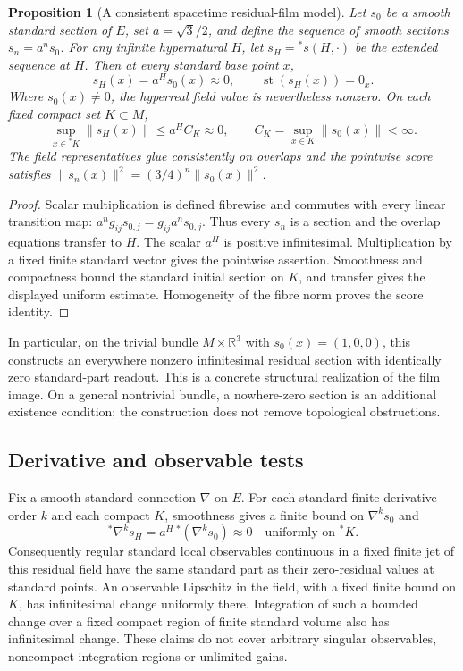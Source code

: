 \documentclass[11pt,a4paper]{article}
\newtheorem{proposition}{Proposition}
\begin{document}
\begin{proposition}[A consistent spacetime residual-film model]
Let $s_0$ be a smooth standard section of $E$, set $a=\sqrt3/2$, and define
the sequence of smooth sections $s_n=a^n s_0$. For any infinite hypernatural
$H$, let $s_H={}^*s(H,\cdot)$ be the extended sequence at $H$. Then at every
standard base point $x$,
\[
s_H(x)=a^H s_0(x)\approx0,\qquad
\operatorname{st}(s_H(x))=0_x.
\]
Where $s_0(x)\ne0$, the hyperreal field value is nevertheless nonzero.
On each fixed compact set $K\subset M$,
\[
\sup_{x\in{}^*K}\|s_H(x)\|
\le a^H C_K\approx0,
\qquad C_K=\sup_{x\in K}\|s_0(x)\|<\infty.
\]
The field representatives glue consistently on overlaps and the pointwise
score satisfies $\|s_n(x)\|^2=(3/4)^n\|s_0(x)\|^2$.
\end{proposition}
\begin{proof}
Scalar multiplication is defined fibrewise and commutes with every linear
transition map: $a^n g_{ij}s_{0,j}=g_{ij}a^n s_{0,j}$. Thus every $s_n$ is
a section and the overlap equations transfer to $H$. The scalar $a^H$ is
positive infinitesimal. Multiplication by a fixed finite standard vector
gives the pointwise assertion. Smoothness and compactness bound the standard
initial section on $K$, and transfer gives the displayed uniform estimate.
Homogeneity of the fibre norm proves the score identity.
\end{proof}

In particular, on the trivial bundle $M\times\mathbb R^3$ with
$s_0(x)=(1,0,0)$, this constructs an everywhere nonzero infinitesimal
residual section with identically zero standard-part readout. This is a
concrete structural realization of the film image. On a general nontrivial
bundle, a nowhere-zero section is an additional existence condition;
the construction does not remove topological obstructions.

\subsection{Derivative and observable tests}
Fix a smooth standard connection $\nabla$ on $E$. For each standard finite
derivative order $k$ and each compact $K$, smoothness gives a finite bound
on $\nabla^k s_0$ and
\[
{}^*\nabla^k s_H=a^H\,{}^*(\nabla^k s_0)\approx0
\quad\text{uniformly on }{}^*K.
\]
Consequently regular standard local observables continuous in a fixed finite
jet of this residual field have the same standard part as their zero-residual
values at standard points. An observable Lipschitz in the field, with a fixed
finite bound on $K$, has infinitesimal change uniformly there. Integration
of such a bounded change over a fixed compact region of finite standard
volume also has infinitesimal change. These claims do not cover arbitrary
singular observables, noncompact integration regions or unlimited gains.
\end{document}
